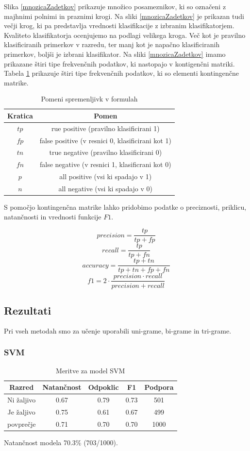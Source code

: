 \documentclass{acm_proc_article-sp}
\begin{document}
Slika \ref{mnozicaZadetkov} prikazuje množico posameznikov, ki so označeni z majhnimi polnimi in praznimi krogi.
Na sliki \ref{mnozicaZadetkov} je prikazan tudi večji krog, ki pa predstavlja vrednosti klasifikacije z izbranim klasifikatorjem.
Kvaliteto klasifikatorja ocenjujemo na podlagi velikega kroga.
Več kot je pravilno klasificiranih primerkov v razredu, ter manj kot je napačno klasificiranih primerkov, boljši je izbrani klasifikator.
Na sliki \ref{mnozicaZadetkov} imamo prikazane štiri tipe frekvenčnih podatkov, ki nastopajo v kontigenčni matriki. 
Tabela \ref{defConfmatrix} prikazuje štiri tipe frekvenčnih podatkov, ki so elementi kontingenčne matrike.

\begin{table}[h!]
	\centering
	\caption{Pomeni spremenljivk v formulah} \label{defConfmatrix}
	\begin{tabular}{|c|c|} 
		\hline
		\textbf{Kratica} & \textbf{Pomen} \\ \hline
		$ tp $ & rue positive (pravilno klasificirani 1) \\ \hline
		$ fp $ & false positive (v resnici 0, klasificirani kot 1) \\ \hline
		$ tn $ & true negative (pravilno klasificirani 0) \\ \hline
		$ fn $ & false negative (v resnici 1, klasificrani kot 0) \\ \hline
		$ p $ & all positive (vsi ki spadajo v 1) \\ \hline
		$ n $ & all negative (vsi ki spadajo v 0) \\ \hline
	\end{tabular}
\end{table}

S pomočjo kontingenčna matrike lahko pridobimo podatke o preciznosti, priklicu, natančnosti in vrednosti funkcije $ F1 $.

$$ precision = \frac{tp}{tp + fp} $$
$$ recall = \frac{tp}{tp + fn} $$
$$ accuracy = \frac{tp + tn}{tp + tn + fp + fn} $$
$$ f1 = 2 \cdot \frac{precision \cdot recall}{precision + recall} $$
\subsection{Rezultati}
Pri vseh metodah smo za učenje uporabili uni-grame, bi-grame in tri-grame.

\subsubsection{SVM}
\begin{table}[h!]
	\centering
	\caption{Meritve za model SVM}
	\begin{tabular}{|c|c|c|c|c|}
		\hline
		\textbf{Razred} & \textbf{Natančnost} & \textbf{Odpoklic} & \textbf{F1} & \textbf{Podpora} \\ \hline
		Ni žaljivo & 0.67 & 0.79 & 0.73 & 501 \\ \hline
		Je žaljivo & 0.75 & 0.61 & 0.67 & 499 \\ \hline \hline
		povprečje & 0.71 & 0.70 & 0.70 & 1000 \\ \hline
	\end{tabular}
\end{table}
Natančnost modela 70.3\% (703/1000).
\end{document}
